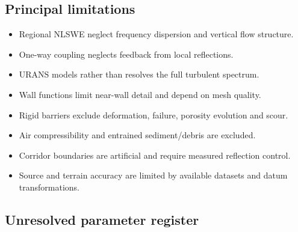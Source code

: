 \documentclass[11pt,a4paper]{article}
\begin{document}
\subsection{Principal limitations}

\begin{itemize}
  \item Regional NLSWE neglect frequency dispersion and vertical flow structure.
  \item One-way coupling neglects feedback from local reflections.
  \item URANS models rather than resolves the full turbulent spectrum.
  \item Wall functions limit near-wall detail and depend on mesh quality.
  \item Rigid barriers exclude deformation, failure, porosity evolution and scour.
  \item Air compressibility and entrained sediment/debris are excluded.
  \item Corridor boundaries are artificial and require measured reflection control.
  \item Source and terrain accuracy are limited by available datasets and datum transformations.
\end{itemize}

\subsection{Unresolved parameter register}
\end{document}
